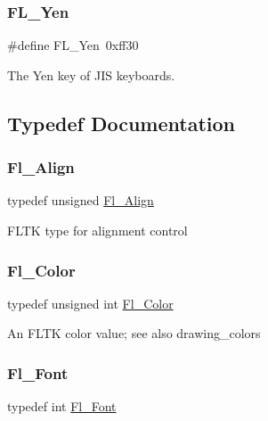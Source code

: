 \subsubsection{\texorpdfstring{F\+L\+\_\+\+Yen}{FL\_Yen}}
{\footnotesize\ttfamily \#define F\+L\+\_\+\+Yen~0xff30}



The Yen key of J\+IS keyboards. 



\subsection{Typedef Documentation}
\mbox{\label{_enumerations_8_h_a44e8bcd1e030e65e4f88cbae64a7c3e3}} 
\subsubsection{\texorpdfstring{Fl\+\_\+\+Align}{Fl\_Align}}
{\footnotesize\ttfamily typedef unsigned \hyperlink{_enumerations_8_h_a44e8bcd1e030e65e4f88cbae64a7c3e3}{Fl\+\_\+\+Align}}

F\+L\+TK type for alignment control \mbox{\label{_enumerations_8_h_a8b762953646f8abee866061f1af78a6a}} 
\subsubsection{\texorpdfstring{Fl\+\_\+\+Color}{Fl\_Color}}
{\footnotesize\ttfamily typedef unsigned int \hyperlink{_enumerations_8_h_a8b762953646f8abee866061f1af78a6a}{Fl\+\_\+\+Color}}

An F\+L\+TK color value; see also drawing\+\_\+colors \mbox{\label{_enumerations_8_h_a2ac46d9f082834b969fffe490a03a709}} 
\subsubsection{\texorpdfstring{Fl\+\_\+\+Font}{Fl\_Font}}
{\footnotesize\ttfamily typedef int \hyperlink{_enumerations_8_h_a2ac46d9f082834b969fffe490a03a709}{Fl\+\_\+\+Font}}


